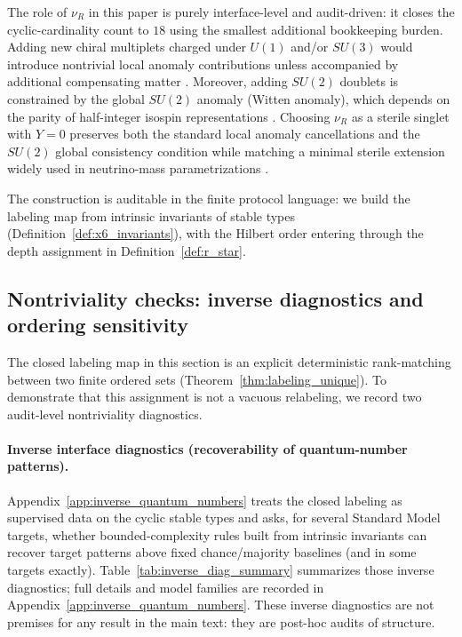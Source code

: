 \begin{remark}\label{rem:nur_minimal_choice}
The role of $\nu_R$ in this paper is purely interface-level and audit-driven: it closes the cyclic-cardinality count to $18$ using the smallest additional bookkeeping burden.
Adding new chiral multiplets charged under $U(1)$ and/or $SU(3)$ would introduce nontrivial local anomaly contributions unless accompanied by additional compensating matter \cite{PeskinSchroeder1995,PDGRPP2024}.
Moreover, adding $SU(2)$ doublets is constrained by the global $SU(2)$ anomaly (Witten anomaly), which depends on the parity of half-integer isospin representations \cite{Witten1982SU2Anomaly}.
Choosing $\nu_R$ as a sterile singlet with $Y=0$ preserves both the standard local anomaly cancellations and the $SU(2)$ global consistency condition while matching a minimal sterile extension widely used in neutrino-mass parametrizations \cite{PDGRPP2024}.
\end{remark}

The construction is auditable in the finite protocol language:
we build the labeling map from intrinsic invariants of stable types (Definition~\ref{def:x6_invariants}), with the Hilbert order entering through the depth assignment in Definition~\ref{def:r_star}.

\subsection{Nontriviality checks: inverse diagnostics and ordering sensitivity}
\label{subsec:labeling_nontriviality}

The closed labeling map in this section is an explicit deterministic rank-matching between two finite ordered sets (Theorem~\ref{thm:labeling_unique}).
To demonstrate that this assignment is not a vacuous relabeling, we record two audit-level nontriviality diagnostics.

\paragraph{Inverse interface diagnostics (recoverability of quantum-number patterns).}
Appendix~\ref{app:inverse_quantum_numbers} treats the closed labeling as supervised data on the cyclic stable types and asks, for several Standard Model targets, whether bounded-complexity rules built from intrinsic invariants can recover target patterns above fixed chance/majority baselines (and in some targets exactly).
Table~\ref{tab:inverse_diag_summary} summarizes those inverse diagnostics; full details and model families are recorded in Appendix~\ref{app:inverse_quantum_numbers}.
These inverse diagnostics are not premises for any result in the main text: they are post-hoc audits of structure.

